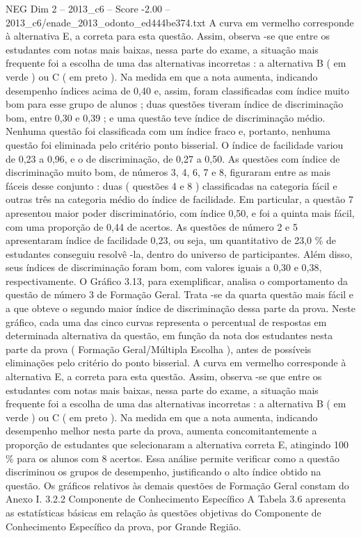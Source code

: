 \begin{textsample}{NEG Dim 2 – 2013\_c6 – Score -2.00 – 2013\_c6/enade\_2013\_odonto\_ed444be374.txt}
A curva em vermelho corresponde à alternativa E, a correta para esta questão.
Assim, observa -se que entre os estudantes com notas mais baixas, nessa parte do exame, a situação mais frequente foi a escolha de uma das alternativas incorretas : a alternativa B ( em verde ) ou C ( em preto ).
Na medida em que a nota aumenta, indicando desempenho índices acima de 0,40 e, assim, foram classificadas com índice muito bom para esse grupo de alunos ; duas questões tiveram índice de discriminação bom, entre 0,30 e 0,39 ; e uma questão teve índice de discriminação médio.
Nenhuma questão foi classificada com um índice fraco e, portanto, nenhuma questão foi eliminada pelo critério ponto bisserial.
O índice de facilidade variou de 0,23 a 0,96, e o de discriminação, de 0,27 a 0,50.
As questões com índice de discriminação muito bom, de números 3, 4, 6, 7 e 8, figuraram entre as mais fáceis desse conjunto : duas ( questões 4 e 8 ) classificadas na categoria fácil e outras três na categoria médio do índice de facilidade.
Em particular, a questão 7 apresentou maior poder discriminatório, com índice 0,50, e foi a quinta mais fácil, com uma proporção de 0,44 de acertos.
As questões de número 2 e 5 apresentaram índice de facilidade 0,23, ou seja, um quantitativo de 23,0 \% de estudantes conseguiu resolvê -la, dentro do universo de participantes.
Além disso, seus índices de discriminação foram bom, com valores iguais a 0,30 e 0,38, respectivamente.
O Gráfico 3.13, para exemplificar, analisa o comportamento da questão de número 3 de Formação Geral.
Trata -se da quarta questão mais fácil e a que obteve o segundo maior índice de discriminação dessa parte da prova.
Neste gráfico, cada uma das cinco curvas representa o percentual de respostas em determinada alternativa da questão, em função da nota dos estudantes nesta parte da prova ( Formação Geral/Múltipla Escolha ), antes de possíveis eliminações pelo critério do ponto bisserial.
A curva em vermelho corresponde à alternativa E, a correta para esta questão.
Assim, observa -se que entre os estudantes com notas mais baixas, nessa parte do exame, a situação mais frequente foi a escolha de uma das alternativas incorretas : a alternativa B ( em verde ) ou C ( em preto ).
Na medida em que a nota aumenta, indicando desempenho melhor nesta parte da prova, aumenta concomitantemente a proporção de estudantes que selecionaram a alternativa correta E, atingindo 100 \% para os alunos com 8 acertos.
Essa análise permite verificar como a questão discriminou os grupos de desempenho, justificando o alto índice obtido na questão.
Os gráficos relativos às demais questões de Formação Geral constam do Anexo I. 3.2.2 Componente de Conhecimento Específico A Tabela 3.6 apresenta as estatísticas básicas em relação às questões objetivas do Componente de Conhecimento Específico da prova, por Grande Região.

\end{textsample}
